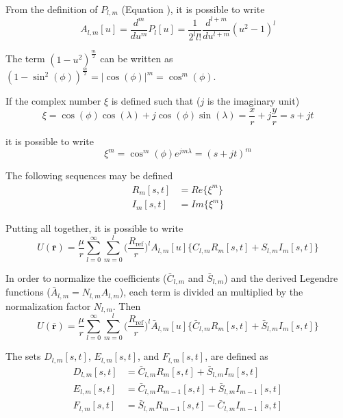 From the definition of $P_{l,m}$ (Equation ), it is possible to write
\begin{equation}
A_{l,m}[u] = \frac{d^m}{d u^m} P_l[u] = \frac{1}{2^l l!} \frac{d^{l+m}}{d u^{l+m}} (u^2 - 1)^l\label{eq:der_leg}
\end{equation}

The term $(1 - u^2)^\frac{m}{2}$ can be written as $(1 - \sin^2(\phi))^\frac{m}{2} = |\cos(\phi)|^m = \cos^m(\phi)$.

If the complex number $\xi$ is defined such that ($j$ is the imaginary unit)
\begin{equation}
\xi = \cos(\phi) \cos(\lambda) + j \cos(\phi) \sin(\lambda) = \frac{x}{r} + j \frac{y}{r} = s + j t
\end{equation}

it is possible to write
\begin{equation}
\xi^m = \cos^m(\phi) e^{j m \lambda} = (s + j t)^m
\end{equation}

The following sequences may be defined
\begin{align}
	R_m[s,t] &= Re\{\xi^m\}\\
	I_m[s,t] &= Im\{\xi^m\}
\end{align}

Putting all together, it is possible to write
\begin{equation}
U(\mathbf{\bar r}) = \frac{\mu}{r} \sum_{l=0}^\infty \sum_{m=0}^l \bigg(\frac{R_{\text{ref}}}{r}\bigg)^l A_{l,m}[u] \{C_{l,m} R_m[s,t] + S_{l,m} I_m[s,t]\}
\end{equation}

In order to normalize the coefficients ($\bar C_{l,m}$ and $\bar S_{l,m}$) and the derived Legendre functions ($\bar A_{l,m} = N_{l,m} A_{l,m}$), each term is divided an multiplied by the normalization factor $N_{l,m}$. Then
\begin{equation}
U(\mathbf{\bar r}) = \frac{\mu}{r} \sum_{l=0}^\infty \sum_{m=0}^l \bigg(\frac{R_{\text{ref}}}{r}\bigg)^l \bar A_{l,m}[u] \{\bar C_{l,m} R_m[s,t] + \bar S_{l,m} I_m[s,t]\}
\end{equation}

The sets $D_{l,m}[s,t]$, $E_{l,m}[s,t]$, and $F_{l,m}[s,t]$, are defined as
\begin{align}
	D_{l,m}[s,t] &= \bar C_{l,m} R_m[s,t] + \bar S_{l,m} I_m[s,t]\\
	E_{l,m}[s,t] &= \bar C_{l,m} R_{m-1}[s,t] + \bar S_{l,m} I_{m-1}[s,t]\\
	F_{l,m}[s,t] &= \bar S_{l,m} R_{m-1}[s,t] - \bar C_{l,m} I_{m-1}[s,t]
\end{align}

